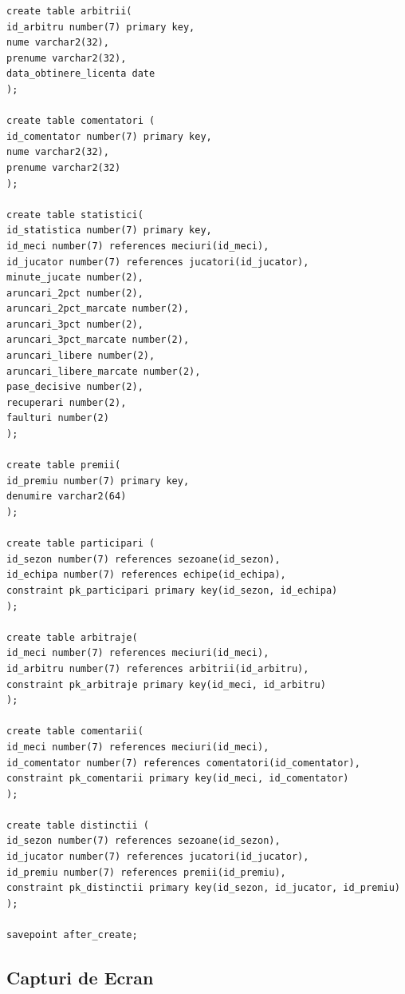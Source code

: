 \documentclass{article}
\begin{document}
\begin{multicols}{2}
\begin{lstlisting}
create table arbitrii(
id_arbitru number(7) primary key,
nume varchar2(32),
prenume varchar2(32),
data_obtinere_licenta date
);

create table comentatori (
id_comentator number(7) primary key,
nume varchar2(32),
prenume varchar2(32)
);

create table statistici(
id_statistica number(7) primary key,
id_meci number(7) references meciuri(id_meci),
id_jucator number(7) references jucatori(id_jucator),
minute_jucate number(2),
aruncari_2pct number(2),
aruncari_2pct_marcate number(2),
aruncari_3pct number(2),
aruncari_3pct_marcate number(2),
aruncari_libere number(2),
aruncari_libere_marcate number(2),
pase_decisive number(2),
recuperari number(2),
faulturi number(2)
);

create table premii(
id_premiu number(7) primary key,
denumire varchar2(64)
);

create table participari (
id_sezon number(7) references sezoane(id_sezon),
id_echipa number(7) references echipe(id_echipa),
constraint pk_participari primary key(id_sezon, id_echipa)
);

create table arbitraje(
id_meci number(7) references meciuri(id_meci),
id_arbitru number(7) references arbitrii(id_arbitru),
constraint pk_arbitraje primary key(id_meci, id_arbitru)
);

create table comentarii(
id_meci number(7) references meciuri(id_meci),
id_comentator number(7) references comentatori(id_comentator),
constraint pk_comentarii primary key(id_meci, id_comentator)
);

create table distinctii (
id_sezon number(7) references sezoane(id_sezon),
id_jucator number(7) references jucatori(id_jucator),
id_premiu number(7) references premii(id_premiu),
constraint pk_distinctii primary key(id_sezon, id_jucator, id_premiu)
);

savepoint after_create;
\end{lstlisting}
\end{multicols}

\pagebreak

\subsection {Capturi de Ecran}
\end{document}
